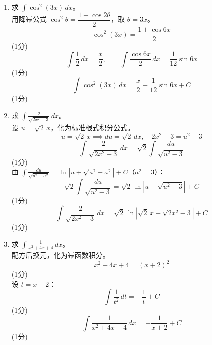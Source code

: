 \documentclass[12pt,a4paper]{exam-zh}
\begin{document}
\begin{solution}
    \begin{enumerate}[label=(\alph*)]
        \item 求 $\displaystyle \int \cos^2(3x)\,dx$。 \\
        用降幂公式 $\cos^2\theta=\dfrac{1+\cos2\theta}{2}$，取 $\theta=3x$。
        \[
            \displaystyle \cos^2(3x) = \frac{1+\cos6x}{2}
        \] \hfill (1分) \\
        \[
            \displaystyle \int\frac12\,dx = \frac{x}{2},\qquad \int\frac{\cos6x}{2}\,dx = \frac{1}{12}\sin6x
        \] \hfill (1分) \\
        \[
            \displaystyle \int\cos^2(3x)\,dx = \frac{x}{2}+\frac{1}{12}\sin6x+C
        \] \hfill (1分)

        \item 求 $\displaystyle \int \frac{2}{\sqrt{2x^2-3}}\,dx$。 \\
        设 $u=\sqrt2\,x$，化为标准根式积分公式。
        \[
            \displaystyle u=\sqrt2\,x \implies du=\sqrt2\,dx,\quad 2x^2-3=u^2-3
        \]
        \[
            \displaystyle \int\frac{2}{\sqrt{2x^2-3}}\,dx = \sqrt2\int\frac{du}{\sqrt{u^2-3}}
        \] \hfill (1分) \\
        由 $\displaystyle\int\frac{du}{\sqrt{u^2-a^2}}=\ln\left|u+\sqrt{u^2-a^2}\right|+C$（$a^2=3$）：
        \[
            \displaystyle \sqrt2\int\frac{du}{\sqrt{u^2-3}} = \sqrt2\,\ln\left|u+\sqrt{u^2-3}\right|+C
        \] \hfill (1分) \\
        \[
            \displaystyle \int\frac{2}{\sqrt{2x^2-3}}\,dx = \sqrt2\,\ln\left|\sqrt2\,x+\sqrt{2x^2-3}\right|+C
        \] \hfill (1分)

        \item 求 $\displaystyle \int \frac{1}{x^2+4x+4}\,dx$。 \\
        配方后换元，化为幂函数积分。
        \[
            \displaystyle x^2+4x+4=(x+2)^2
        \] \hfill (1分) \\
        设 $t=x+2$：
        \[
            \displaystyle \int\frac{1}{t^2}\,dt = -\frac{1}{t}+C
        \] \hfill (1分) \\
        \[
            \displaystyle \int\frac{1}{x^2+4x+4}\,dx = -\frac{1}{x+2}+C
        \] \hfill (1分)
    \end{enumerate}
\end{solution}


\vfill %
\end{document}

